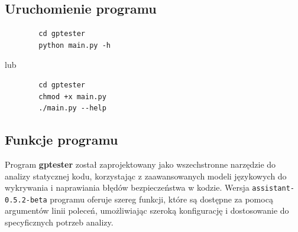 \subsection{Uruchomienie programu}

\begin{listing}
    \begin{verbatim}
        cd gptester
        python main.py -h
    \end{verbatim}
\end{listing}
lub 
\begin{listing}
    \begin{verbatim}
        cd gptester
        chmod +x main.py
        ./main.py --help
    \end{verbatim}
\end{listing}

\subsection{Funkcje programu}

Program \textbf{gptester} został zaprojektowany jako wszechstronne narzędzie do analizy statycznej kodu, korzystając z zaawansowanych modeli językowych do wykrywania i naprawiania błędów bezpieczeństwa w kodzie. Wersja \texttt{assistant-0.5.2-beta} programu oferuje szereg funkcji, które są dostępne za pomocą argumentów linii poleceń, umożliwiając szeroką konfigurację i dostosowanie do specyficznych potrzeb analizy.

